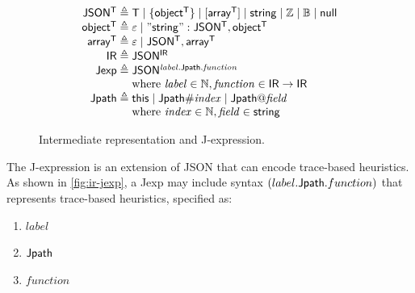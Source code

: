 \begin{figure}
\[\begin{array}{r@{\;}l}
\mathsf{JSON^T}\triangleq&\mathsf T\mid\{\mathsf{object^T}\}\mid[\mathsf{array^T}]\mid\mathsf{string}\mid\Int\mid\Bool\mid\mathsf{null}\\
\mathsf{object^T}\triangleq&\nil\mid\mathsf{"string": JSON^T,object^T}\\
\mathsf{array^T}\triangleq&\nil\mid\mathsf{JSON^T,array^T}\\
\mathsf{IR}\triangleq&\mathsf{JSON^{IR}}\\
\mathsf{Jexp}\triangleq&\mathsf{JSON^{\Jref{\mathit{label}}{\Jpath}{\mathit{function}}}}\\
&\text{where }\mathit{label}\in\Nat,\mathit{function}\in\mathsf{IR}\to\mathsf{IR}\\
\Jpath\triangleq&\This\mid\Jpath\Number\mathit{index}\mid\Jpath\At\mathit{field}\\
&\text{where }\mathit{index}\in\Nat,\mathit{field}\in\mathsf{string}
\end{array}\]
\caption{Intermediate representation and J-expression.}
\label{fig:ir-jexp}
\end{figure}

The J-expression is an extension of JSON that can encode trace-based heuristics.
As shown in \autoref{fig:ir-jexp}, a Jexp may include syntax
$(label.\mathsf{Jpath}.function)$ that represents trace-based heuristics, specified as:
\begin{enumerate}
\item $label$
\item $\mathsf{Jpath}$
\item $function$
\end{enumerate}
